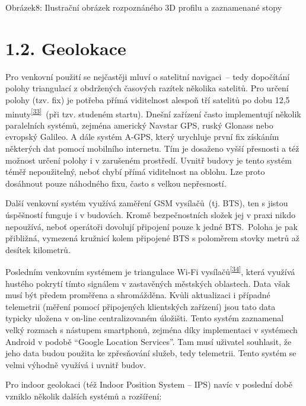 Obrázek8: Ilustrační obrázek rozpoznáného 3D profilu a zaznamenané stopy

\section{1.2. Geolokace}\label{geolokace}

Pro venkovní použití se nejčastěji mluví o satelitní navigaci~-- tedy dopočítání polohy triangulací z obdržených časových razítek několika satelitů. Pro určení polohy (tzv. fix) je potřeba přímá viditelnost alespoň tří satelitů po dobu 12,5 minuty\textsuperscript{\href{}{{[}33{]}}}~(při tzv. studeném startu). Dnešní zařízení často implementují několik paralelních systémů, zejména americký Navstar GPS, ruský Glonass nebo evropský Galileo. A dále systém A-GPS, který urychluje první fix získáním některých dat pomocí mobilního internetu. Tím je dosaženo vyšší přesnosti a též možnost určení polohy i v zarušeném prostředí. Uvnitř budovy je tento systém téměř nepoužitelný, neboť chybí přímá viditelnost na oblohu. Lze proto dosáhnout pouze náhodného fixu, často s velkou nepřesností.

Další venkovní systém využívá zaměření GSM vysílačů~(tj. BTS), ten s jistou úspěšností funguje i v budovách. Kromě bezpečnostních složek jej v praxi nikdo nepoužívá, neboť operátoři dovolují připojení pouze k jedné BTS.~Poloha je pak přibližná, vymezená kružnicí kolem připojené BTS s poloměrem stovky metrů až desítek kilometrů.

Posledním venkovním systémem je triangulace Wi-Fi vysílačů\textsuperscript{\href{}{{[}34{]}}}, která využívá hustého pokrytí tímto signálem v zastavěných městských oblastech. Data však musí být předem proměřena a shromážděna. Kvůli aktualizaci i případné telemetrii (měření pomocí připojených klientských zařízení) jsou tato data typicky uložena v on-line centralizovaném úložišti. Tento systém zaznamenal velký rozmach s nástupem smartphonů, zejména díky implementaci v systémech Android v podobě ``Google Location Services''. Tam musí uživatel souhlasit, že jeho data budou použita ke zpřesňování služeb, tedy telemetrii. Tento systém se velmi výhodně využívá i uvnitř budov.

Pro indoor geolokaci (též Indoor Position System -- IPS) navíc v poslední době vzniklo několik dalších systémů a rozšíření:

